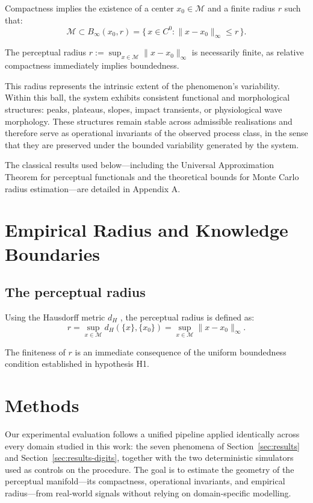 \documentclass[10pt]{article}
\theoremstyle{plain}
\theoremstyle{definition}
\theoremstyle{remark}
\begin{document}
Compactness implies the existence of a center $x_0 \in \mathcal{M}$ 
and a finite radius $r$ such that:
\[
\mathcal{M} \subset B_\infty(x_0,r)
= \{\,x \in C^0 : \|x-x_0\|_\infty \le r \,\}.
\]

The perceptual radius $r := \sup_{x\in\mathcal{M}} \|x-x_0\|_\infty$ is
necessarily finite, as relative compactness immediately implies boundedness.

This radius represents the intrinsic extent of the phenomenon’s variability.
Within this ball, the system exhibits consistent functional and morphological
structures: peaks, plateaus, slopes, impact transients, or physiological wave
morphology. These structures remain stable across admissible realisations and
therefore serve as operational invariants of the observed process class, in the
sense that they are preserved under the bounded variability generated by the
system.



The classical results used below---including the Universal Approximation Theorem for perceptual functionals and the theoretical bounds for Monte Carlo radius estimation---are detailed in Appendix A.

\section{Empirical Radius and Knowledge Boundaries}
\label{sec:radius-section}


\subsection{The perceptual radius}

Using the Hausdorff metric $d_H$ \citep{edgar2008measure}, the perceptual 
radius is defined as:
\[
r = \sup_{x\in\mathcal{M}} d_H(\{x\}, \{x_0\})
= \sup_{x\in\mathcal{M}} \|x - x_0\|_\infty.
\]

The finiteness of $r$ is an immediate consequence of the uniform boundedness
condition established in hypothesis H1.

\section{Methods}
\label{sec:methods}
Our experimental evaluation follows a unified pipeline applied identically
across every domain studied in this work: the seven phenomena of
Section~\ref{sec:results} and Section~\ref{sec:results-digits}, together with
the two deterministic simulators used as controls on the procedure. The goal is to
estimate the geometry of the perceptual manifold---its compactness, operational
invariants, and empirical radius---from real-world signals without relying on 
domain-specific modelling.
\end{document}
